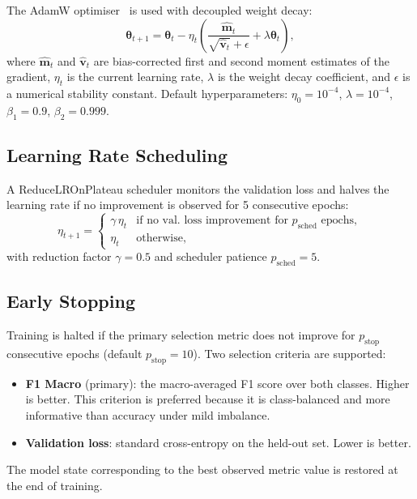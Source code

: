 \documentclass[11pt,a4paper]{article}
\begin{document}
The AdamW optimiser~\cite{loshchilov2019} is used with decoupled weight decay:
\begin{equation}
  \boldsymbol{\theta}_{t+1} = \boldsymbol{\theta}_t
    - \eta_t \left(\frac{\hat{\mathbf{m}}_t}{\sqrt{\hat{\mathbf{v}}_t} + \epsilon} + \lambda \boldsymbol{\theta}_t\right),
\end{equation}
where $\hat{\mathbf{m}}_t$ and $\hat{\mathbf{v}}_t$ are bias-corrected first and second
moment estimates of the gradient, $\eta_t$ is the current learning rate,
$\lambda$ is the weight decay coefficient, and $\epsilon$ is a numerical stability
constant. Default hyperparameters: $\eta_0 = 10^{-4}$, $\lambda = 10^{-4}$,
$\beta_1 = 0.9$, $\beta_2 = 0.999$.

\subsection{Learning Rate Scheduling}

A ReduceLROnPlateau scheduler monitors the validation loss and halves the
learning rate if no improvement is observed for 5 consecutive epochs:
\begin{equation}
  \eta_{t+1} = \begin{cases}
    \gamma \, \eta_t & \text{if no val. loss improvement for } p_{\text{sched}} \text{ epochs}, \\
    \eta_t           & \text{otherwise},
  \end{cases}
\end{equation}
with reduction factor $\gamma = 0.5$ and scheduler patience $p_{\text{sched}} = 5$.

\subsection{Early Stopping}

Training is halted if the primary selection metric does not improve for
$p_{\text{stop}}$ consecutive epochs (default $p_{\text{stop}} = 10$).
Two selection criteria are supported:
\begin{itemize}
  \item \textbf{F1 Macro} (primary): the macro-averaged F1 score over both classes.
        Higher is better. This criterion is preferred because it is class-balanced and
        more informative than accuracy under mild imbalance.
  \item \textbf{Validation loss}: standard cross-entropy on the held-out set.
        Lower is better.
\end{itemize}
The model state corresponding to the best observed metric value is restored
at the end of training.
\end{document}
